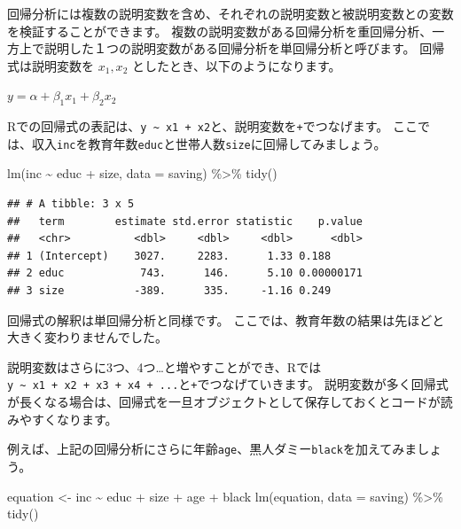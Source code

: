 \documentclass[
]{book}
\newenvironment{Shaded}{\begin{snugshade}}{\end{snugshade}}
\newcommand{\AttributeTok}[1]{\textcolor[rgb]{0.77,0.63,0.00}{#1}}
\newcommand{\FunctionTok}[1]{\textcolor[rgb]{0.00,0.00,0.00}{#1}}
\newcommand{\NormalTok}[1]{#1}
\newcommand{\OtherTok}[1]{\textcolor[rgb]{0.56,0.35,0.01}{#1}}
\newcommand{\SpecialCharTok}[1]{\textcolor[rgb]{0.00,0.00,0.00}{#1}}
\begin{document}
回帰分析には複数の説明変数を含め、それぞれの説明変数と被説明変数との変数を検証することができます。
複数の説明変数がある回帰分析を重回帰分析、一方上で説明した１つの説明変数がある回帰分析を単回帰分析と呼びます。
回帰式は説明変数を \(x_1, x_2\) としたとき、以下のようになります。

\(y = \alpha + \beta_1 x_1 + \beta_2 x_2\)

Rでの回帰式の表記は、\texttt{y\ \textasciitilde{}\ x1\ +\ x2}と、説明変数を\texttt{+}でつなげます。
ここでは、収入\texttt{inc}を教育年数\texttt{educ}と世帯人数\texttt{size}に回帰してみましょう。

\begin{Shaded}
\begin{Highlighting}[]
\FunctionTok{lm}\NormalTok{(inc }\SpecialCharTok{\textasciitilde{}}\NormalTok{ educ }\SpecialCharTok{+}\NormalTok{ size, }\AttributeTok{data =}\NormalTok{ saving) }\SpecialCharTok{\%\textgreater{}\%}
  \FunctionTok{tidy}\NormalTok{()}
\end{Highlighting}
\end{Shaded}

\begin{verbatim}
## # A tibble: 3 x 5
##   term        estimate std.error statistic    p.value
##   <chr>          <dbl>     <dbl>     <dbl>      <dbl>
## 1 (Intercept)    3027.     2283.      1.33 0.188     
## 2 educ            743.      146.      5.10 0.00000171
## 3 size           -389.      335.     -1.16 0.249
\end{verbatim}

回帰式の解釈は単回帰分析と同様です。
ここでは、教育年数の結果は先ほどと大きく変わりませんでした。

説明変数はさらに3つ、4つ\ldots と増やすことができ、Rでは\texttt{y\ \textasciitilde{}\ x1\ +\ x2\ +\ x3\ +\ x4\ +\ ...}と\texttt{+}でつなげていきます。
説明変数が多く回帰式が長くなる場合は、回帰式を一旦オブジェクトとして保存しておくとコードが読みやすくなります。

例えば、上記の回帰分析にさらに年齢\texttt{age}、黒人ダミー\texttt{black}を加えてみましょう。

\begin{Shaded}
\begin{Highlighting}[]
\NormalTok{equation }\OtherTok{\textless{}{-}}\NormalTok{ inc }\SpecialCharTok{\textasciitilde{}}\NormalTok{ educ }\SpecialCharTok{+}\NormalTok{ size }\SpecialCharTok{+}\NormalTok{ age }\SpecialCharTok{+}\NormalTok{ black}
\FunctionTok{lm}\NormalTok{(equation, }\AttributeTok{data =}\NormalTok{ saving) }\SpecialCharTok{\%\textgreater{}\%}
  \FunctionTok{tidy}\NormalTok{()}
\end{Highlighting}
\end{Shaded}
\end{document}
